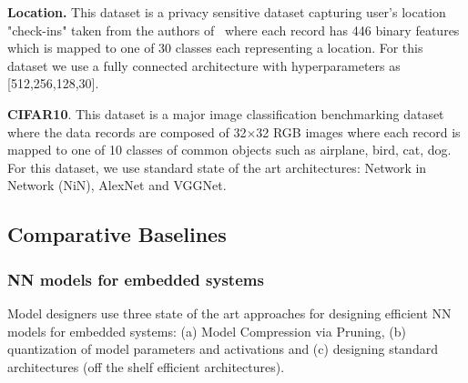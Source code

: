\noindent\textbf{Location.} This dataset is a privacy sensitive dataset capturing user's location "check-ins" taken from the authors of~\cite{shokri2017membership} where each record has 446 binary features which is mapped to one of 30 classes each representing a location. For this dataset we use a fully connected architecture with hyperparameters as [512,256,128,30].



\noindent\textbf{CIFAR10}. 
This dataset is a major image classification benchmarking dataset where the data records are composed of 32$\times$32 RGB images where each record is mapped to one of 10 classes of common objects such as airplane, bird, cat, dog.
For this dataset, we use standard state of the art architectures: Network in Network (NiN), AlexNet and VGGNet. 


\subsection{Comparative Baselines}
\label{baselines}

\subsubsection{NN models for embedded systems}

Model designers use three state of the art approaches for designing efficient NN models for embedded systems: (a) Model Compression via Pruning, (b) quantization of model parameters and activations and (c) designing standard architectures (off the shelf efficient architectures).

